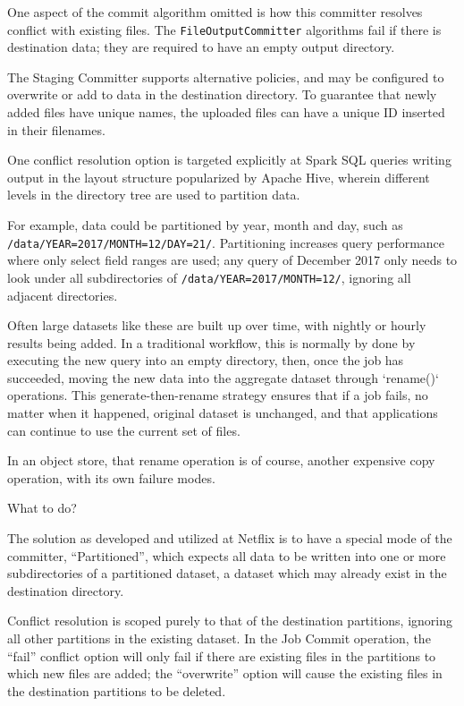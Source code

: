 \documentclass[conference]{IEEEtran}
\begin{document}
One aspect of the commit algorithm omitted is how this committer resolves
conflict with existing files.
The \texttt{FileOutputCommitter} algorithms fail if there is destination data;
they are required to have an empty output directory.

The Staging Committer supports alternative policies, and may be configured
to overwrite or add to data in the destination directory.
To guarantee that newly added files have unique names, the
uploaded files can have a unique ID inserted in their filenames.

One conflict resolution option is targeted explicitly at Spark SQL queries writing
output in the layout structure popularized by Apache Hive, wherein
different levels in the directory tree are used to partition data.

For example, data could be partitioned by year, month and day, such as
\texttt{/data/YEAR=2017/MONTH=12/DAY=21/}.
Partitioning increases query performance where only select field ranges are used;
any query of December 2017 only needs to look under all subdirectories of
\texttt{/data/YEAR=2017/MONTH=12/}, ignoring all adjacent directories.

Often large datasets like these are built up over time, with nightly or hourly
results being added.
In a traditional workflow, this is normally by done by
executing the new query into an empty directory, then, once the job has succeeded,
moving the new data into the aggregate dataset through `rename()` operations.
This generate-then-rename strategy ensures that if a job fails, no matter when
it happened, original dataset is unchanged,
and that applications can continue to use the current set of files.

In an object store, that rename operation is of course, another expensive copy
operation, with its own failure modes.

What to do?

The solution as developed and utilized at Netflix is to have a special mode
of the committer, ``Partitioned'', which expects all data to be written
into one or more subdirectories of a partitioned dataset, a dataset which
may already exist in the destination directory.

Conflict resolution is scoped purely to that of the destination partitions,
ignoring all other partitions in the existing dataset.
In the Job Commit operation, the ``fail'' conflict option will only fail if there
are existing files in the partitions to which new files are added;
the ``overwrite'' option will cause the existing files in the destination
partitions to be deleted.
\end{document}
